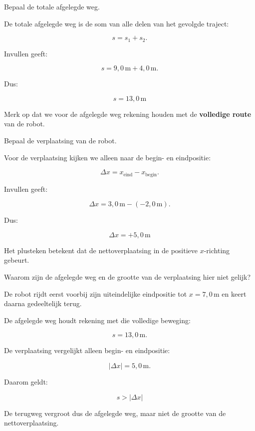 \documentclass{ximera}
\begin{document}
\begin{oefening}{\oefB\ESS}
  
  \begin{question}
  Bepaal de totale afgelegde weg.
  
  \begin{oplossing}
  De totale afgelegde weg is de som van alle delen van het gevolgde traject:
  
  \[
  s=s_1+s_2.
  \]
  
  Invullen geeft:
  
  \[
  s
  =
  9{,}0\,\mathrm{m}
  +
  4{,}0\,\mathrm{m}.
  \]
  
  Dus:
  
  \[
  \boxed{s=13{,}0\,\mathrm{m}}
  \]
  
  Merk op dat we voor de afgelegde weg rekening houden met de
  \textbf{volledige route} van de robot.
  \end{oplossing}
  \end{question}
  
  
  \begin{question}
  Bepaal de verplaatsing van de robot.
  
  \begin{oplossing}
  Voor de verplaatsing kijken we alleen naar de begin- en eindpositie:
  
  \[
  \Delta x
  =
  x_{\text{eind}}
  -
  x_{\text{begin}}.
  \]
  
  Invullen geeft:
  
  \[
  \Delta x
  =
  3{,}0\,\mathrm{m}
  -
  (-2{,}0\,\mathrm{m}).
  \]
  
  Dus:
  
  \[
  \boxed{\Delta x=+5{,}0\,\mathrm{m}}
  \]
  
  Het plusteken betekent dat de nettoverplaatsing in de positieve
  $x$-richting gebeurt.
  \end{oplossing}
  \end{question}
  
  
  \begin{question}
  Waarom zijn de afgelegde weg en de grootte van de verplaatsing hier niet
  gelijk?
  
  \begin{oplossing}
  De robot rijdt eerst voorbij zijn uiteindelijke eindpositie tot
  $x=7{,}0\,\mathrm{m}$ en keert daarna gedeeltelijk terug.
  
  De afgelegde weg houdt rekening met die volledige beweging:
  
  \[
  s=13{,}0\,\mathrm{m}.
  \]
  
  De verplaatsing vergelijkt alleen begin- en eindpositie:
  
  \[
  |\Delta x|=5{,}0\,\mathrm{m}.
  \]
  
  Daarom geldt:
  
  \[
  \boxed{s>|\Delta x|}
  \]
  
  De terugweg vergroot dus de afgelegde weg, maar niet de grootte van de
  nettoverplaatsing.
  \end{oplossing}
  \end{question}
  
  \end{oefening}
  
\end{document}
